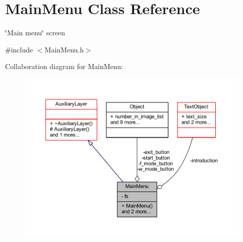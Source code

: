 \hypertarget{class_main_menu}{}\section{Main\+Menu Class Reference}
\label{class_main_menu}


\char`\"{}\+Main menu\char`\"{} screen  




{\ttfamily \#include $<$Main\+Menu.\+h$>$}



Collaboration diagram for Main\+Menu\+:\nopagebreak
\begin{figure}[H]
\begin{center}
\leavevmode
\includegraphics[width=350pt]{class_main_menu__coll__graph}
\end{center}
\end{figure}
